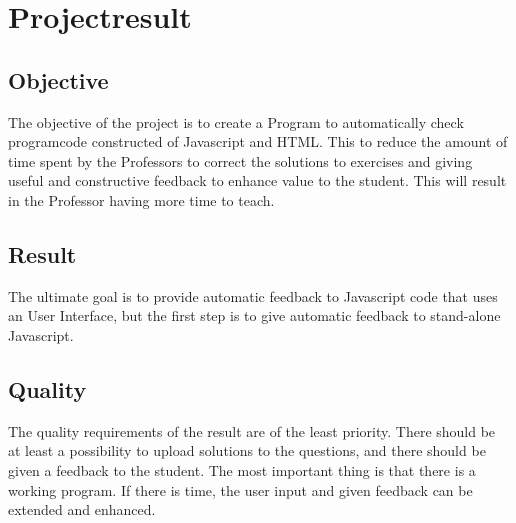 \documentclass{article}
\begin{document}
\section{Projectresult}

\subsection{Objective}

The objective of the project is to create a Program to automatically check programcode constructed of Javascript and HTML. This to reduce the amount of time spent by the Professors to correct the solutions to exercises and giving useful and constructive feedback to enhance value to the student. 
This will result in the Professor having more time to teach. 

\subsection{Result}

The ultimate goal is to provide automatic feedback to Javascript code that uses an User Interface, but the first step is to give automatic feedback to stand-alone Javascript.

\subsection{Quality}

The quality requirements of the result are of the least priority. There should be at least a possibility to upload solutions to the questions, and there should be given a feedback to the student. The most important thing is that there is a working program. If there is time, the user input and given feedback can be extended and enhanced.
\end{document}
